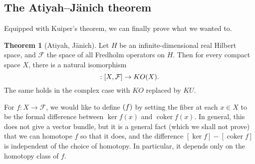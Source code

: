 \documentclass{shortart}
\theoremstyle{definition}
\newtheorem*{thm}{Theorem}
\let\index\relax %
\DeclareMathOperator{\coker}{coker}
\DeclareMathOperator{\index}{idx}
\begin{document}
\subsection{The Atiyah--J\"anich theorem}
Equipped with Kuiper's theorem, we can finally prove what we wanted to.
\begin{thm}[Atiyah, J\"anich]
  Let $H$ be an infinite-dimensional real Hilbert space, and $\mathcal{F}$ the space of all Fredholm operators on $H$. Then for every compact space $X$, there is a natural isomorphism
  \[
    \index: [X, \mathcal{F}] \to KO(X).
  \]
  The same holds in the complex case with $KO$ replaced by $KU$.
\end{thm}

For $f: X \to \mathcal{F}$, we would like to define $\index(f)$ by setting the fiber at each $x \in X$ to be the formal difference between $\ker f(x)$ and $\coker f(x)$. In general, this does not give a vector bundle, but it is a general fact (which we shall not prove) that we can homotope $f$ so that it does, and the difference $[\ker f] - [\coker f]$ is independent of the choice of homotopy. In particular, it depends only on the homotopy class of $f$.
\end{document}
